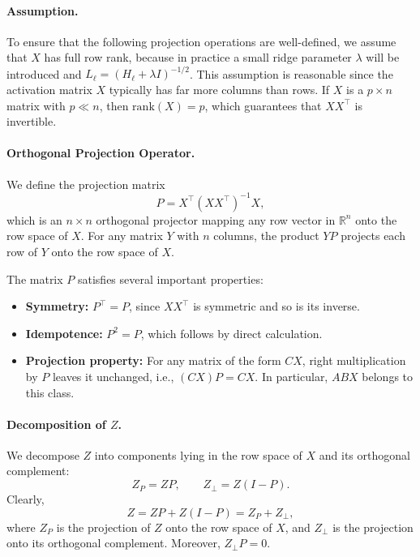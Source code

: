 \paragraph{Assumption.} 
To ensure that the following projection operations are well-defined, we assume that $X$ has full row rank, because in practice a small ridge parameter $\lambda$ will be introduced and $L_\ell=(H_\ell+\lambda I)^{-1/2}$.
This assumption is reasonable since the activation matrix $X$ typically has far more columns than rows. If $X$ is a $p \times n$ matrix with $p \ll n$, then $\mathrm{rank}(X) = p$, which guarantees that $XX^\top$ is invertible.

\paragraph{Orthogonal Projection Operator.} 
We define the projection matrix
\begin{equation}
   P = X^\top(XX^\top)^{-1}X,
\end{equation}
which is an $n \times n$ orthogonal projector mapping any row vector in $\mathbb{R}^n$ onto the row space of $X$. For any matrix $Y$ with $n$ columns, the product $YP$ projects each row of $Y$ onto the row space of $X$. 

The matrix $P$ satisfies several important properties:
\begin{itemize}
    \item \textbf{Symmetry:} $P^\top = P$, since $XX^\top$ is symmetric and so is its inverse.
    \item \textbf{Idempotence:} $P^2 = P$, which follows by direct calculation.
    \item \textbf{Projection property:} For any matrix of the form $CX$, right multiplication by $P$ leaves it unchanged, i.e., $(CX)P = CX$. In particular, $ABX$ belongs to this class.
\end{itemize}

\paragraph{Decomposition of $Z$.} 
We decompose $Z$ into components lying in the row space of $X$ and its orthogonal complement:
\begin{equation}
   Z_P = ZP, \qquad Z_\perp = Z(I-P).
\end{equation}
Clearly,
\begin{equation}
   Z = ZP + Z(I-P) = Z_P + Z_\perp,
\end{equation}
where $Z_P$ is the projection of $Z$ onto the row space of $X$, and $Z_\perp$ is the projection onto its orthogonal complement. Moreover, $Z_\perp P = 0$.

